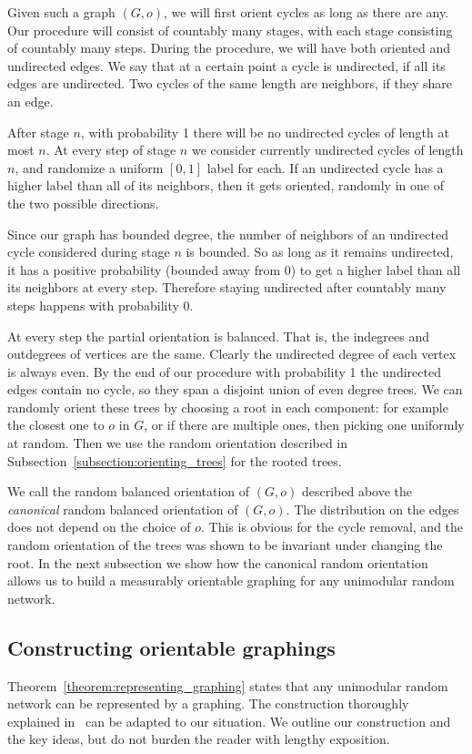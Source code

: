 Given such a graph $(G,o)$, we will first orient cycles as long as there are any. Our procedure will consist of countably many stages, with each stage consisting of countably many steps. During the procedure, we will have both oriented and undirected edges. We say that at a certain point a cycle is undirected, if all its edges are undirected. Two cycles of the same length are neighbors, if they share an edge.

After stage $n$, with probability 1 there will be no undirected cycles of length at most $n$. At every step of stage $n$ we consider currently undirected cycles of length $n$, and randomize a uniform $[0,1]$ label for each. If an undirected cycle has a higher label than all of its neighbors, then it gets oriented, randomly in one of the two possible directions.

Since our graph has bounded degree, the number of neighbors of an undirected cycle considered during stage $n$ is bounded. So as long as it remains undirected, it has a positive probability (bounded away from 0) to get a higher label than all its neighbors at every step. Therefore staying undirected after countably many steps happens with probability 0.

At every step the partial orientation is balanced. That is, the indegrees and outdegrees of vertices are the same. Clearly the undirected degree of each vertex is always even. By the end of our procedure with probability 1 the undirected edges contain no cycle, so they span a disjoint union of even degree trees. We can randomly orient these trees by choosing a root in each component: for example the closest one to $o$ in $G$, or if there are multiple ones, then picking one uniformly at random. Then we use the random orientation described in Subsection~\ref{subsection:orienting_trees} for the rooted trees.

We call the random balanced orientation of $(G,o)$ described above the \emph{canonical} random balanced orientation of $(G,o)$. The distribution on the edges does not depend on the choice of $o$. This is obvious for the cycle removal, and the random orientation of the trees was shown to be invariant under changing the root. In the next subsection we show how the canonical random orientation allows us to build a measurably orientable graphing for any unimodular random network.


\subsection{Constructing orientable graphings} \label{subsection:constructing_graphings}
Theorem~\ref{theorem:representing_graphing} states that any unimodular random network can be represented by a graphing. The construction thoroughly explained in~\cite[Theorem~18.37]{lovasz2012large} can be adapted to our situation. We outline our construction and the key ideas, but do not burden the reader with lengthy exposition.

